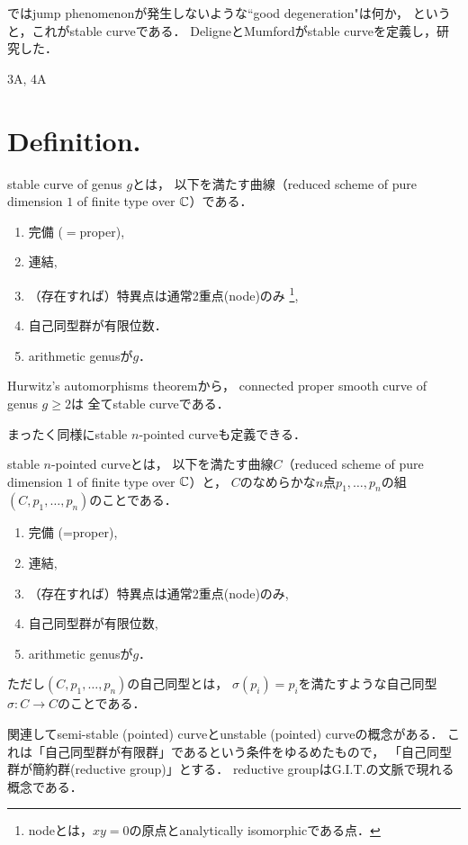 \documentclass[a4paper]{jsarticle}
\begin{document}
    ではjump phenomenonが発生しないような``good degeneration"は何か，
    というと，これがstable curveである．
    DeligneとMumfordがstable curveを定義し，研究した．

    3A, 4A

\section{Definition.}
    \begin{Def}
        stable curve of genus $g$とは，
        以下を満たす曲線（reduced scheme of pure dimension $1$ of finite type over $\mathbb{C}$）である．
        \begin{enumerate}
            \item 完備 ($=$proper),
            \item 連結,
            \item （存在すれば）特異点は通常2重点(node)のみ
                   \footnote{ nodeとは，$xy=0$の原点とanalytically isomorphicである点． },
            \item 自己同型群が有限位数．
            \item arithmetic genusが$g$．
        \end{enumerate}
    \end{Def}
    \begin{Remark}
    Hurwitz's automorphisms theoremから，
    connected proper smooth curve of genus $g \geq 2$は
    全てstable curveである．
    \end{Remark}

    まったく同様にstable $n$-pointed curveも定義できる．
    \begin{Def}
        stable $n$-pointed curveとは，
        以下を満たす曲線$C$（reduced scheme of pure dimension $1$ of finite type over $\mathbb{C}$）と，
        $C$のなめらかな$n$点$p_1,\dots,p_n$の組$(C, p_1,\dots,p_n)$のことである．
        \begin{enumerate}
            \item 完備 (=proper),
            \item 連結,
            \item （存在すれば）特異点は通常2重点(node)のみ,
            \item 自己同型群が有限位数,
            \item arithmetic genusが$g$．
        \end{enumerate}
        ただし$(C, p_1,\dots,p_n)$の自己同型とは，
        $\sigma(p_i)=p_i$を満たすような自己同型$\sigma: C \to C$のことである．
    \end{Def}
    関連してsemi-stable (pointed) curveとunstable (pointed) curveの概念がある．
    これは「自己同型群が有限群」であるという条件をゆるめたもので，
    「自己同型群が簡約群(reductive group)」とする．
    reductive groupはG.I.T.の文脈で現れる概念である．
\end{document}
